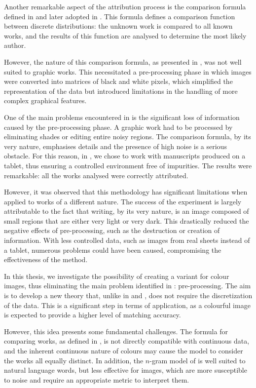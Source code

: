 \begin{toReview}
		\noindent Another remarkable aspect of the attribution process is the comparison formula defined in \cite{SapAttribution} and later adopted in \cite{thesis}. This formula defines a comparison function between discrete distributions: the unknown work is compared to all known works, and the results of this function are analysed to determine the most likely author.

		\noindent However, the nature of this comparison formula, as presented in \cite{thesis}, was not well suited to graphic works. This necessitated a pre-processing phase in which images were converted into matrices of black and white pixels, which simplified the representation of the data but introduced limitations in the handling of more complex graphical features.

		\bigskip \noindent One of the main problems encountered in \cite{thesis} is the significant loss of information caused by the pre-processing phase. A graphic work had to be processed by eliminating shades or editing entire noisy regions. The comparison formula, by its very nature, emphasises details and the presence of high noise is a serious obstacle. For this reason, in \cite{thesis}, we chose to work with manuscripts produced on a tablet, thus ensuring a controlled environment free of impurities. The results were remarkable: all the works analysed were correctly attributed.

		\noindent However, it was observed that this methodology has significant limitations when applied to works of a different nature. The success of the experiment is largely attributable to the fact that writing, by its very nature, is an image composed of small regions that are either very light or very dark. This drastically reduced the negative effects of pre-processing, such as the destruction or creation of information. With less controlled data, such as images from real sheets instead of a tablet, numerous problems could have been caused, compromising the effectiveness of the method.

		\bigskip \noindent In this thesis, we investigate the possibility of creating a variant for colour images, thus eliminating the main problem identified in \cite{thesis}: pre-processing. The aim is to develop a new theory that, unlike in \cite{thesis} and \cite{SapAttribution}, does not require the discretization of the data. This is a significant step in terms of application, as a colourful image is expected to provide a higher level of matching accuracy.

		\noindent However, this idea presents some fundamental challenges. The formula for comparing works, as defined in \cite{SapAttribution}, is not directly compatible with continuous data, and the inherent continuous nature of colours may cause the model to consider the works all equally distinct. In addition, the $n$-gram model of \citeauthor{Shannon_ngrammodel} is well suited to natural language words, but less effective for images, which are more susceptible to noise and require an appropriate metric to interpret them.


\end{toReview}

